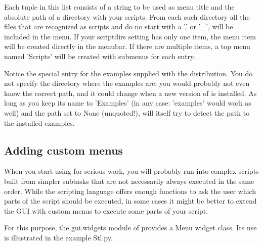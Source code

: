 Each tuple in this list consists of a string to be used as menu title and the absolute path of a directory with your scripts. From each such directory all the files that are recognized as \pyformex scripts and do no start with a '.' or '_', will be included in the menu. If your scriptdirs setting has only one item, the menu item will be created directly in the menubar. If there are multiple items, a top menu named 'Scripts' will be created with submenus for each entry.

Notice the special entry for the examples supplied with the distribution. You do not specify the directory where the examples are: you would probably not even know the correct path, and it could change when a new version of \pyf is installed. As long as you keep its name to 'Examples' (in any case: 'examples' would work as well) and the path set to None (unquoted!), \pyformex will itself try to detect the path to the installed examples. 


\subsection{Adding custom menus}
\label{sec:adding-custom-menus}

When you start using \pyformex for serious work, you will probably run into complex scripts built from simpler subtasks that are not necessarily always executed in the same order. While the \pyformex scripting language offers enough functions to ask the user which parts of the script should be executed, in some cases it might be better to extend the \pyformex GUI with custom menus to execute some parts of your script.

For this purpose, the gui.widgets module of \pyformex provides a Menu widget class. Its use is illustrated in the example Stl.py.

